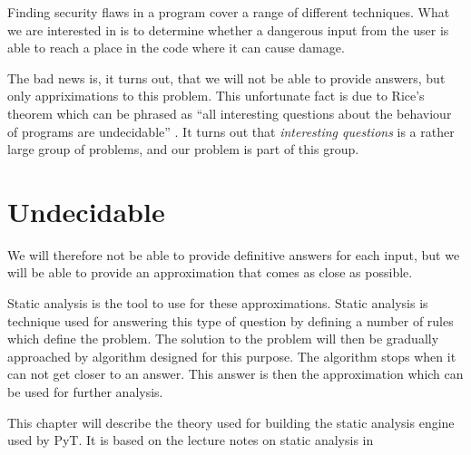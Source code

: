 Finding security flaws in a program cover a range of different techniques.
What we are interested in is to determine whether a dangerous input from the user is able to reach a place in the code where it can cause damage.


The bad news is, it turns out, that we will not be able to provide answers, but only appriximations to this problem.
This unfortunate fact is due to Rice's theorem which can be phrased as ``all interesting questions about the behaviour of programs are undecidable'' \citep[p.~3]{schwartzbach}.
It turns out that \emph{interesting questions} is a rather large group of problems, and our problem is part of this group.
\section{Undecidable}\label{theory_intro}

We will therefore not be able to provide definitive answers for each input, but we will be able to provide an approximation that comes as close as possible.

Static analysis is the tool to use for these approximations.
Static analysis is technique used for answering this type of question by defining a number of rules which define the problem.
The solution to the problem will then be gradually approached by algorithm designed for this purpose.
The algorithm stops when it can not get closer to an answer.
This answer is then the approximation which can be used for further analysis.

This chapter will describe the theory used for building the static analysis engine used by PyT.
It is based on the lecture notes on static analysis in \citet{schwartzbach}
